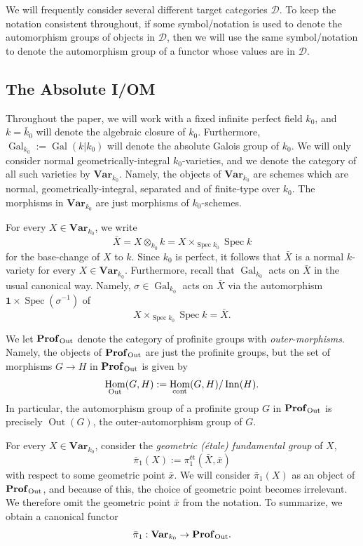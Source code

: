 \documentclass[11pt]{amsart}
\theoremstyle{definition}
\theoremstyle{remark}
\numberwithin{equation}{section}
\DeclareMathOperator{\Gal}{Gal}
\DeclareMathOperator{\Spec}{Spec}
\DeclareMathOperator{\Hom}{Hom}
\DeclareMathOperator{\Out}{Out}
\DeclareMathOperator{\Inn}{Inn}
\newcommand{\Profinite}{{\mathbf{Prof}_{\rm Out}}}
\newcommand{\one}{\mathbf{1}}
\newcommand{\Var}{\mathbf{Var}}
\newcommand{\Galk}{{\Gal_{k_0}}}
\begin{document}
We will frequently consider several different target categories $\mathcal{D}$.
To keep the notation consistent throughout, if some symbol/notation is used to denote the automorphism groups of objects in $\mathcal{D}$, then we will use the same symbol/notation to denote the automorphism group of a functor whose values are in $\mathcal{D}$.

\subsection{The Absolute I/OM}
\label{subsection: intro / absolute-IOM}

Throughout the paper, we will work with a fixed infinite perfect field $k_0$, and $k = \bar k_0$ will denote the algebraic closure of $k_0$.
Furthermore, $\Galk := \Gal(k|k_0)$ will denote the absolute Galois group of $k_0$.
We will only consider normal geometrically-integral $k_0$-varieties, and we denote the category of all such varieties by $\Var_{k_0}$.
Namely, the objects of $\Var_{k_0}$ are schemes which are normal, geometrically-integral, separated and of finite-type over $k_0$.
The morphisms in $\Var_{k_0}$ are just morphisms of $k_0$-schemes.

For every $X \in \Var_{k_0}$, we write 
\[ \bar X = X \otimes_{k_0} k = X \times_{\Spec k_0} \Spec k \]
for the base-change of $X$ to $k$.
Since $k_0$ is perfect, it follows that $\bar X$ is a normal $k$-variety for every $X \in \Var_{k_0}$.
Furthermore, recall that $\Galk$ acts on $\bar X$ in the usual canonical way.
Namely, $\sigma \in \Galk$ acts on $\bar X$ via the automorphism $\one \times \Spec(\sigma^{-1})$ of 
\[ X \times_{\Spec k_0} \Spec k = \bar X. \]

We let $\Profinite$ denote the category of profinite groups with \emph{outer-morphisms}.
Namely, the objects of $\Profinite$ are just the profinite groups, but the set of morphisms $G \rightarrow H$ in $\Profinite$ is given by 
\[ \Hom_{\Out}(G,H) := \Hom_{\rm cont}(G,H)/\Inn(H). \]
In particular, the automorphism group of a profinite group $G$ in $\Profinite$ is precisely $\Out(G)$, the outer-automorphism group of $G$.

For every $X \in \Var_{k_0}$, consider the \emph{geometric (\'etale) fundamental group} of $X$,
\[ \bar\pi_1(X) := \pi_1^\text{\'et}(\bar X,\bar x) \]
with respect to some geometric point $\bar x$.
We will consider $\bar\pi_1(X)$ as an object of $\Profinite$, and because of this, the choice of geometric point becomes irrelevant.
We therefore omit the geometric point $\bar x$ from the notation.
To summarize, we obtain a canonical functor
\[ \bar\pi_1 : \Var_{k_0} \rightarrow \Profinite. \]
\end{document}
